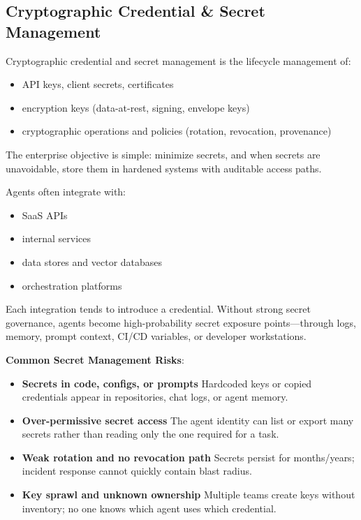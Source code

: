 \begin{TNtwocol}
    \section{Cryptographic Credential & Secret Management }

    Cryptographic credential and secret management is the lifecycle management of:

    \begin{itemize}
        \item API keys, client secrets, certificates
        \item encryption keys (data-at-rest, signing, envelope keys)
        \item cryptographic operations and policies (rotation, revocation, provenance)
    \end{itemize}

    The enterprise objective is simple: minimize secrets, and when secrets are unavoidable, store them in hardened systems with auditable access paths.

    Agents often integrate with:

    \begin{itemize}
        \item SaaS APIs
        \item internal services
        \item data stores and vector databases
        \item orchestration platforms
    \end{itemize}

    Each integration tends to introduce a credential. Without strong secret governance, agents become high-probability secret exposure points—through logs, memory, prompt context, CI/CD variables, or developer workstations.

    \textbf{Common Secret Management Risks}:
    \begin{itemize}
        \item \textbf{Secrets in code, configs, or prompts} Hardcoded keys or copied credentials appear in repositories, chat logs, or agent memory.
        \item \textbf{Over-permissive secret access} The agent identity can list or export many secrets rather than reading only the one required for a task.
        \item \textbf{Weak rotation and no revocation path} Secrets persist for months/years; incident response cannot quickly contain blast radius.
        \item \textbf{Key sprawl and unknown ownership} Multiple teams create keys without inventory; no one knows which agent uses which credential.
    \end{itemize}


\end{TNtwocol}
